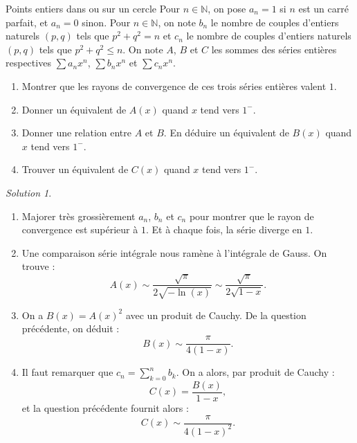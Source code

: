 \documentclass[french]{book}
\newcommand{\N}{\mathbb{N}}
\theoremstyle{definition}
\theoremstyle{remark}
\newtheorem*{sol}{Solution}
\begin{document}
\begin{exo}[2]{Points entiers dans ou sur un cercle}
	Pour $n\in\N$, on pose $a_n=1$ si $n$ est un carré parfait, et $a_n=0$ sinon. Pour $n\in\N$, on note $b_n$ le nombre de couples d'entiers naturels $(p,q)$ tels que $p^2+q^2=n$ et $c_n$ le nombre de couples d'entiers naturels $(p,q)$ tels que $p^2+q^2\leqslant n$. On note $A$, $B$ et $C$ les sommes des séries entières respectives $\displaystyle\sum a_nx^n$, $\displaystyle\sum b_nx^n$ et $\displaystyle\sum c_n x^n$.
	\begin{enumerate}
		\item Montrer que les rayons de convergence de ces trois séries entières valent $1$.
		\item Donner un équivalent de $A(x)$ quand $x$ tend vers $1^-$.
		\item Donner une relation entre $A$ et $B$. En déduire un équivalent de $B(x)$ quand $x$ tend vers $1^-$.
		\item Trouver un équivalent de $C(x)$ quand $x$ tend vers $1^-$.
	\end{enumerate}
\end{exo}
\begin{sol}
	\begin{enumerate}
		\item Majorer très grossièrement $a_n$, $b_n$ et $c_n$ pour montrer que le rayon de convergence est supérieur à $1$. Et à chaque fois, la série diverge en $1$.
		\item Une comparaison série intégrale nous ramène à l'intégrale de Gauss. On trouve :
		$$A(x)\sim\frac{\sqrt{\pi}}{2\sqrt{-\ln(x)}}\sim\frac{\sqrt{\pi}}{2\sqrt{1-x}}.$$
		\item On a $B(x)=A(x)^2$ avec un produit de Cauchy. De la question précédente, on déduit :
		$$B(x)\sim\frac{\pi}{4(1-x)}.$$
		\item Il faut remarquer que $c_n=\displaystyle\sum_{k=0}^{n}b_k$. On a alors, par produit de Cauchy :
		$$C(x)=\frac{B(x)}{1-x},$$ et la question précédente fournit alors :
		$$C(x)\sim\frac{\pi}{4(1-x)^2}.$$
	\end{enumerate}
\end{sol}
\end{document}
